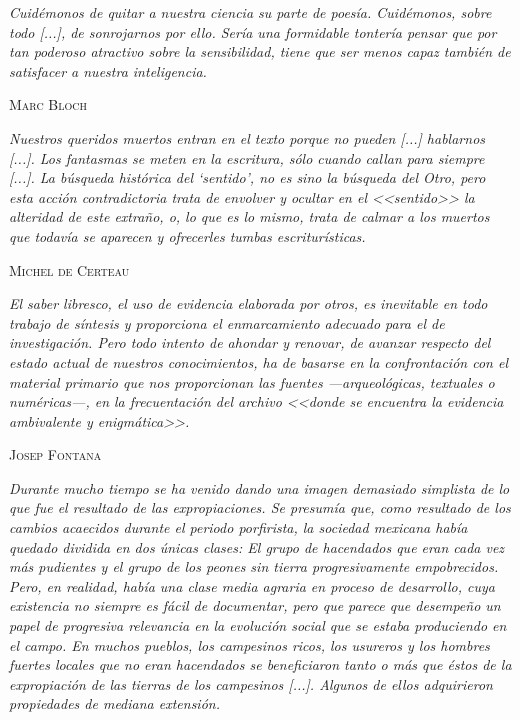 \documentclass[14pt,twoside,final]{extbook} %
\begin{document}
\begin{flushright}
\footnotesize
\begin{minipage}{8cm}
\emph{Cuidémonos de quitar a nuestra ciencia su parte de poesía. Cuidémonos, sobre todo [...], de sonrojarnos por ello. Sería una formidable tontería pensar que por tan poderoso atractivo sobre la sensibilidad, tiene que ser menos capaz también de satisfacer a nuestra inteligencia.}
\begin{flushright}
\textsc{Marc Bloch}
\end{flushright}
\begin{flushright}
\begin{minipage}{8cm}
\emph{Nuestros queridos muertos entran en el texto porque no pueden [...] hablarnos [...]. Los fantasmas se meten en la escritura, sólo cuando callan para siempre [...]. La búsqueda histórica del `sentido', no es sino la búsqueda del \emph{Otro,} pero esta acción contradictoria trata de envolver y ocultar en el <<sentido>> la alteridad de este extraño, o, lo que es lo mismo, trata de calmar a los muertos que todavía se aparecen y ofrecerles tumbas escriturísticas.}
\end{minipage}
\end{flushright}
\begin{flushright}
\textsc{Michel de Certeau}
\end{flushright}
\begin{flushright}
\begin{minipage}{8cm}
\emph{El saber libresco, el uso de evidencia elaborada por otros, es inevitable en todo trabajo de síntesis y proporciona el enmarcamiento adecuado para el de investigación. Pero todo intento de ahondar y renovar, de avanzar respecto del estado actual de nuestros conocimientos, ha de basarse en la confrontación con el material primario que nos proporcionan las fuentes ---arqueológicas, textuales o numéricas---, en la frecuentación del archivo <<donde se encuentra la evidencia ambivalente y enigmática>>.}
\end{minipage}
\end{flushright}
\begin{flushright}
\textsc{Josep Fontana}
\end{flushright}
\begin{flushright}
\begin{minipage}{8cm}
\emph{Durante mucho tiempo se ha venido dando una imagen demasiado simplista de lo que fue el resultado de las expropiaciones. Se presumía que, como resultado de los cambios acaecidos durante el
periodo porfirista, la sociedad mexicana había quedado dividida en dos únicas clases: El grupo de hacendados que eran cada vez más pudientes y el grupo de los peones sin tierra progresivamente empobrecidos. Pero, en realidad, había una clase media agraria en proceso de desarrollo, cuya existencia no siempre es fácil de documentar, pero que parece que desempeño un papel de progresiva relevancia en la evolución social que se estaba produciendo en el campo. En muchos pueblos, los campesinos ricos, los usureros y los hombres fuertes locales que no eran hacendados se beneficiaron tanto o más que éstos de la expropiación de las tierras de los campesinos [...]. Algunos de ellos adquirieron propiedades de mediana extensión.}

\end{minipage}
\end{flushright}
\end{minipage}
\end{flushright}
\end{document}
